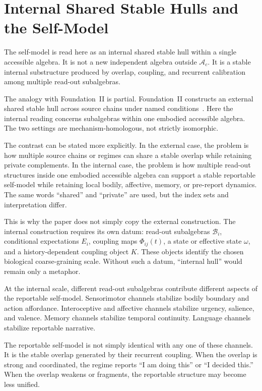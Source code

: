 \documentclass[12pt]{article}
\theoremstyle{definition}
\theoremstyle{remark}
\newcommand{\Ac}{\mathcal A_c}
\begin{document}
\section{Internal Shared Stable Hulls and the Self-Model}

The self-model is read here as an internal shared stable hull within a
single accessible algebra. It is not a new independent algebra outside
\(\Ac\). It is a stable internal substructure produced by overlap,
coupling, and recurrent calibration among multiple read-out
subalgebras.

The analogy with Foundation~II is partial. Foundation~II constructs an
external shared stable hull across source chains under named
conditions~\cite{FoundationII}. Here the internal reading concerns
subalgebras within one embodied accessible algebra. The two settings are
mechanism-homologous, not strictly isomorphic.

The contrast can be stated more explicitly. In the external case, the
problem is how multiple source chains or regimes can share a stable
overlap while retaining private complements. In the internal case, the
problem is how multiple read-out structures inside one embodied
accessible algebra can support a stable reportable self-model while
retaining local bodily, affective, memory, or pre-report dynamics. The
same words ``shared'' and ``private'' are used, but the index sets and
interpretation differ.

This is why the paper does not simply copy the external construction.
The internal construction requires its own datum: read-out subalgebras
\(\mathcal B_i\), conditional expectations \(E_i\), coupling maps
\(\Phi_{ij}(t)\), a state or effective state \(\omega\), and a
history-dependent coupling object \(K\). These objects identify the
chosen biological coarse-graining scale. Without such a datum,
``internal hull'' would remain only a metaphor.

At the internal scale, different read-out subalgebras contribute
different aspects of the reportable self-model. Sensorimotor channels
stabilize bodily boundary and action affordance. Interoceptive and
affective channels stabilize urgency, salience, and valence. Memory
channels stabilize temporal continuity. Language channels stabilize
reportable narrative.

The reportable self-model is not simply identical with any one of these
channels. It is the stable overlap generated by their recurrent
coupling. When the overlap is strong and coordinated, the regime reports
``I am doing this'' or ``I decided this.'' When the overlap weakens or
fragments, the reportable structure may become less unified.
\end{document}
